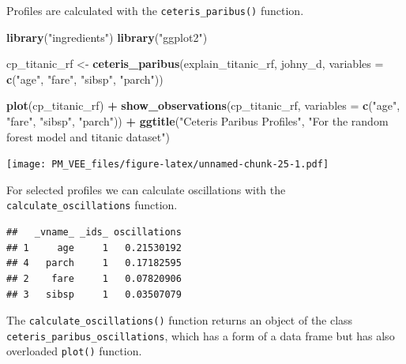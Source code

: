 \documentclass[12pt,]{krantz}
\newenvironment{Shaded}{\begin{snugshade}}{\end{snugshade}}
\newcommand{\DataTypeTok}[1]{\textcolor[rgb]{0.13,0.29,0.53}{#1}}
\newcommand{\KeywordTok}[1]{\textcolor[rgb]{0.13,0.29,0.53}{\textbf{#1}}}
\newcommand{\NormalTok}[1]{#1}
\newcommand{\OperatorTok}[1]{\textcolor[rgb]{0.81,0.36,0.00}{\textbf{#1}}}
\newcommand{\StringTok}[1]{\textcolor[rgb]{0.31,0.60,0.02}{#1}}
\theoremstyle{definition}
\theoremstyle{definition}
\theoremstyle{definition}
\theoremstyle{remark}
\begin{document}
Profiles are calculated with the \texttt{ceteris\_paribus()} function.

\begin{Shaded}
\begin{Highlighting}[]
\KeywordTok{library}\NormalTok{(}\StringTok{"ingredients"}\NormalTok{)}
\KeywordTok{library}\NormalTok{(}\StringTok{"ggplot2"}\NormalTok{)}

\NormalTok{cp_titanic_rf <-}\StringTok{ }\KeywordTok{ceteris_paribus}\NormalTok{(explain_titanic_rf, johny_d, }
                            \DataTypeTok{variables =} \KeywordTok{c}\NormalTok{(}\StringTok{"age"}\NormalTok{, }\StringTok{"fare"}\NormalTok{, }\StringTok{"sibsp"}\NormalTok{, }\StringTok{"parch"}\NormalTok{))}

\KeywordTok{plot}\NormalTok{(cp_titanic_rf) }\OperatorTok{+}
\StringTok{  }\KeywordTok{show_observations}\NormalTok{(cp_titanic_rf, }\DataTypeTok{variables =} \KeywordTok{c}\NormalTok{(}\StringTok{"age"}\NormalTok{, }\StringTok{"fare"}\NormalTok{, }\StringTok{"sibsp"}\NormalTok{, }\StringTok{"parch"}\NormalTok{)) }\OperatorTok{+}
\StringTok{  }\KeywordTok{ggtitle}\NormalTok{(}\StringTok{"Ceteris Paribus Profiles"}\NormalTok{, }\StringTok{"For the random forest model and titanic dataset"}\NormalTok{)}
\end{Highlighting}
\end{Shaded}

\texttt{[image: PM\_VEE\_files/figure-latex/unnamed-chunk-25-1.pdf]}

For selected profiles we can calculate oscillations with the
\texttt{calculate\_oscillations} function.

\begin{Shaded}
\end{Shaded}

\begin{verbatim}
##   _vname_ _ids_ oscillations
## 1     age     1   0.21530192
## 4   parch     1   0.17182595
## 2    fare     1   0.07820906
## 3   sibsp     1   0.03507079
\end{verbatim}

The \texttt{calculate\_oscillations()} function returns an object of the
class \texttt{ceteris\_paribus\_oscillations}, which has a form of a
data frame but has also overloaded \texttt{plot()} function.
\end{document}
